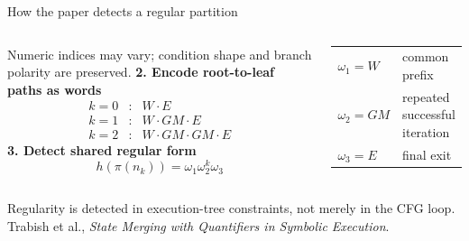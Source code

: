 \documentclass[english,aspectratio=169,t]{beamer}
\newcommand{\sourcefoot}[1]{\vfill\tiny\color{gray}#1}
\begin{document}
\begin{frame}{How the paper detects a regular partition}
\begin{columns}[T,onlytextwidth]
      \vspace{0.1em}
      {\scriptsize Numeric indices may vary; condition shape and branch polarity are preserved.}
      \textbf{2. Encode root-to-leaf paths as words}\\[-0.15em]
      \[
      \begin{array}{rcl}
      k=0 &:& W\cdot E\\[0.25em]
      k=1 &:& W\cdot GM\cdot E\\[0.25em]
      k=2 &:& W\cdot GM\cdot GM\cdot E
      \end{array}
      \]
      \vspace{-0.3em}
      \textbf{3. Detect shared regular form}\\[-0.15em]
      \[
        h(\pi(n_k))=\omega_1\omega_2^k\omega_3
      \]
      \begin{center}
      \small
      \begin{tabular}{@{}ll@{}}
        $\omega_1=W$ & common prefix\\
        $\omega_2=GM$ & repeated successful iteration\\
        $\omega_3=E$ & final exit
      \end{tabular}
      \end{center}
  \end{columns}
  \vspace{0.05em}
  \centering
  {\small Regularity is detected in execution-tree constraints, not merely in the CFG loop.}
  \sourcefoot{Trabish et al., \emph{State Merging with Quantifiers in Symbolic Execution}.}
\end{frame}
\end{document}
